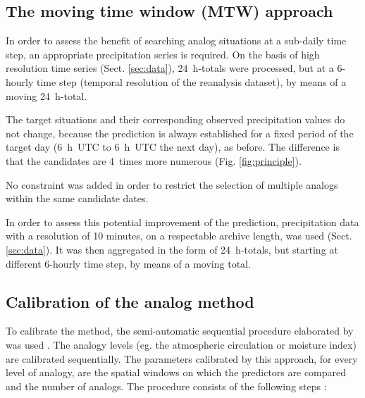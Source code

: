 \documentclass[hess, manuscript]{copernicus}
\begin{document}
\subsection{The moving time window (MTW) approach}
\label{sec:mtw}

In order to assess the benefit of searching analog situations at a sub-daily time step, an appropriate precipitation series is required. On the basis of high resolution time series (Sect. \ref{sec:data}), 24~h-totals were processed, but at a 6-hourly time step (temporal resolution of the reanalysis dataset), by means of a moving 24~h-total. 

The target situations and their corresponding observed precipitation values do not change, because the prediction is always established for a fixed period of the target day (6~h~UTC to 6~h~UTC the next day), as before. The difference is that the candidates are 4~times more numerous (Fig. \ref{fig:principle}).

No constraint was added in order to restrict the selection of multiple analogs within the same candidate dates.



In order to assess this potential improvement of the prediction, precipitation data with a resolution of 10 minutes, on a respectable archive length, was used (Sect. \ref{sec:data}). It was then aggregated in the form of 24~h-totals, but starting at different 6-hourly time step, by means of a moving total.


\subsection{Calibration of the analog method}
\label{sec:calibration}

To calibrate the method, the semi-automatic sequential procedure elaborated by \citet{Bontron2004} was used \cite[see also ][]{BenDaoud2016}. The analogy levels (eg. the atmospheric circulation or moisture index) are calibrated sequentially. The parameters calibrated by this approach, for every level of analogy, are the spatial windows on which the predictors are compared and the number of analogs. The procedure consists of the following steps \citep{Bontron2004}:
\end{document}
